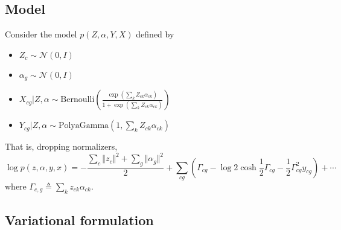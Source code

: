 \documentclass{article}
\begin{document}
\subsection{Model}

Consider the model $p(Z,\alpha,Y,X)$ defined by 

\begin{itemize}
    \item $Z_c \sim \mathcal{N}(0,I)$
    \item $\alpha_g \sim \mathcal{N}(0,I)$
    \item $X_{cg}|Z,\alpha \sim \mathrm{Bernoulli}\left(\frac{\exp(\sum_k Z_{ck} \alpha_{ck})}{1+\exp(\sum_k Z_{ck} \alpha_{ck})}\right)$
    \item $Y_{cg}|Z,\alpha \sim \mathrm{PolyaGamma}(1,\sum_k Z_{ck} \alpha_{ck})$
\end{itemize}
That is, dropping normalizers,
\[
\log p(z,\alpha,y,x) = -\frac{\sum_c \Vert z_c \Vert^2 + \sum_g \Vert \alpha_g \Vert^2}{2} + \sum_{cg}\left(\Gamma_{cg} - \log 2 \cosh \frac{1}{2}\Gamma_{cg} -\frac{1}{2}\Gamma_{cg}^2 y_{cg}\right) + \cdots
\]
where $\Gamma_{c,g} \triangleq \sum_k z_{ck} \alpha_{ck}$.

\subsection{Variational formulation}
\end{document}
